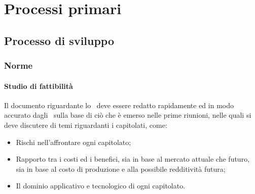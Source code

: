 \documentclass[../NormeProgetto.tex]{subfiles}
\begin{document}
\section{Processi primari}
	\subsection{Processo di sviluppo}
		\subsubsection{Norme}
			\paragraph{Studio di fattibilità}
			Il documento riguardante lo \studiodifattibilita\ deve essere redatto rapidamente ed in modo accurato dagli \analisti\ sulla base di ciò che è emerso nelle prime riunioni, nelle quali si deve discutere di temi riguardanti i capitolati, come:
			\begin{itemize}
				\item Rischi nell'affrontare ogni capitolato\g;
				\item Rapporto tra i costi ed i benefici, sia in base al mercato attuale che futuro, sia in base al costo di produzione e alla possibile redditività futura;
				\item Il dominio applicativo e tecnologico di ogni capitolato\g.
			\end{itemize}
\end{document}
